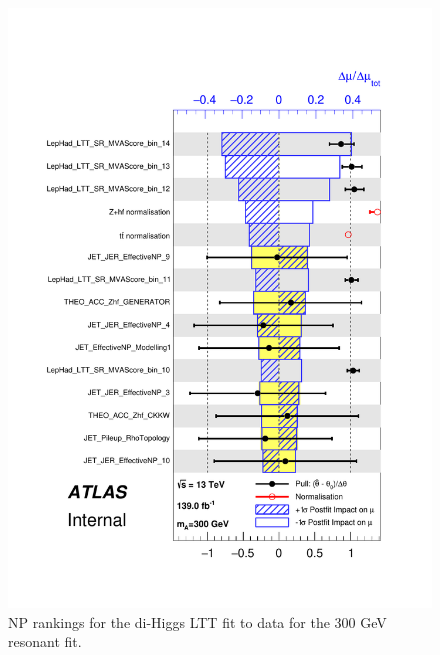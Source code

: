    \begin{figure}
   \centering
   \includegraphics[width=.8\textwidth]{figures/results/HH/LepHad/pulls_SigXsecOverSM_300_LTT.pdf}
   \caption{NP rankings for the di-Higgs \lephad LTT fit to data for the 300 GeV resonant fit.}
   \label{fig:LepHadPostfitNPRankings2HDM300LTT}
   \end{figure}
   
